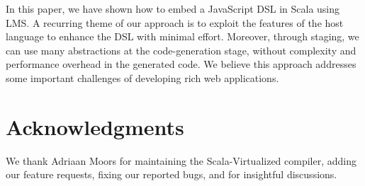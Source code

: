 \documentclass[runningheads,a4paper]{llncs}
\begin{document}
In this paper, we have shown how to embed a JavaScript DSL in Scala
using LMS. A recurring theme of our approach is to exploit the
features of the host language to enhance the DSL with minimal
effort. Moreover, through staging, we can use many abstractions at the
code-generation stage, without complexity and performance overhead in
the generated code. We believe this approach addresses some important
challenges of developing rich web applications.

\section{Acknowledgments}
We thank Adriaan Moors for maintaining the Scala-Virtualized compiler, adding our feature requests, fixing our reported bugs, and for insightful discussions.



\end{document}
